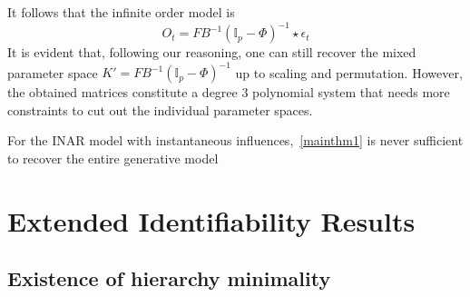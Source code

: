 \documentclass[10pt]{article}
\numberwithin{figure}{section}
\begin{document}
It follows that the infinite order model is
\begin{equation}
O_t = FB^{-1}(\mathbb{I}_{p}-\Phi)^{-1}\star\epsilon_t
\end{equation}
It is evident that, following our reasoning, one can still recover the mixed parameter space $K' = FB^{-1}(\mathbb{I}_{p}-\Phi)^{-1}$ up to scaling and permutation. However, the obtained matrices constitute a degree $3$ polynomial system that needs more constraints to cut out the individual parameter spaces.
\begin{aclaim}
    For the INAR model with instantaneous influences,~\autoref{mainthm1} is never sufficient to recover the entire generative model
    \end{aclaim}
\section{Extended Identifiability Results }\label{extentded_proof}

\subsection{Existence of hierarchy minimality}
\end{document}
